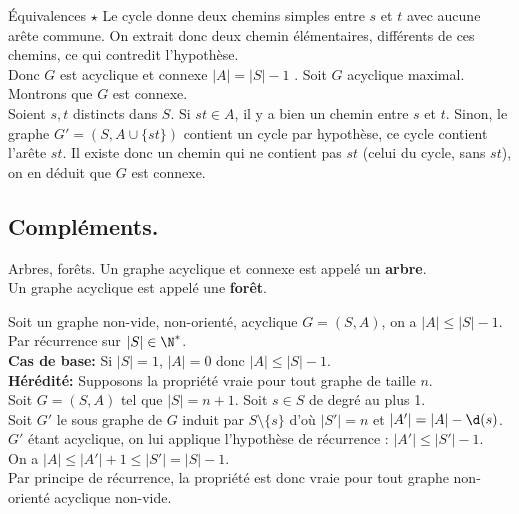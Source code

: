 \documentclass[french, 11pt]{article}
\begin{document}
\begin{prop}{Équivalences $\star$}{}
    Le cycle donne deux chemins simples entre $s$ et $t$ avec aucune arête commune. On extrait donc deux chemin élémentaires, différents de ces chemins, ce qui contredit l'hypothèse.\\
    Donc $G$ est acyclique et connexe $|A|=|S|-1$\n
    . Soit $G$ acyclique maximal. Montrons que $G$ est connexe.\\
    Soient $s,t$ distincts dans $S$. Si $st\in A$, il y a bien un chemin entre $s$ et $t$. Sinon, le graphe $G'=(S,A\cup\{st\})$ contient un cycle par hypothèse, ce cycle contient l'arête $st$. Il existe donc un chemin qui ne contient pas $st$ (celui du cycle, sans $st$), on en déduit que $G$ est connexe.
\end{prop}

\vspace*{-0.7cm}

\subsection{Compléments.}

\begin{defi}{Arbres, forêts.}{}
    Un graphe acyclique et connexe est appelé un \textbf{arbre}.\\
    Un graphe acyclique est appelé une \textbf{forêt}. 
\end{defi}

\begin{prop}{}{}
    Soit un graphe non-vide, non-orienté, acyclique $G=(S,A)$, on a $|A|\leq|S|-1$.
    \tcblower
    Par récurrence sur $|S|\in\N^*$.\\
    \textbf{Cas de base:} Si $|S|=1$, $|A|=0$ donc $|A|\leq|S|-1$.\\
    \textbf{Hérédité:} Supposons la propriété vraie pour tout graphe de taille $n$.\\
    Soit $G=(S,A)$ tel que $|S|=n+1$. Soit $s\in S$ de degré au plus 1.\\
    Soit $G'$ le sous graphe de $G$ induit par $S\setminus\{s\}$ d'où $|S'| = n$ et $|A'|=|A|-\d(s)$.\\
    $G'$ étant acyclique, on lui applique l'hypothèse de récurrence : $|A'|\leq|S'|-1$.\\
    On a $|A|\leq|A'|+1\leq|S'|=|S|-1$.\\
    Par principe de récurrence, la propriété est donc vraie pour tout graphe non-orienté acyclique non-vide.
\end{prop}

\vspace*{-0.7cm}
\end{document}
